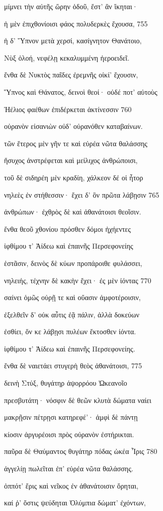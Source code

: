 μίμνει τὴν αὐτῆς ὥρην ὁδοῦ, ἔστ' ἂν ἵκηται· 

ἡ μὲν ἐπιχθονίοισι φάος πολυδερκὲς ἔχουσα, \num{755} 

ἡ δ' Ὕπνον μετὰ χερσί, κασίγνητον Θανάτοιο, 

Νὺξ ὀλοή, νεφέλῃ κεκαλυμμένη ἠεροειδεῖ.

ἔνθα δὲ Νυκτὸς παῖδες ἐρεμνῆς οἰκί' ἔχουσιν,

Ὕπνος καὶ Θάνατος, δεινοὶ θεοί· οὐδέ ποτ' αὐτοὺς 

Ἠέλιος φαέθων ἐπιδέρκεται ἀκτίνεσσιν \num{760}

οὐρανὸν εἰσανιὼν οὐδ' οὐρανόθεν καταβαίνων. 

τῶν ἕτερος μὲν γῆν τε καὶ εὐρέα νῶτα θαλάσσης 

ἥσυχος ἀνστρέφεται καὶ μείλιχος ἀνθρώποισι,

τοῦ δὲ σιδηρέη μὲν κραδίη, χάλκεον δέ οἱ ἦτορ

νηλεὲς ἐν στήθεσσιν· ἔχει δ' ὃν πρῶτα λάβῃσιν \num{765} 

ἀνθρώπων· ἐχθρὸς δὲ καὶ ἀθανάτοισι θεοῖσιν. 

ἔνθα θεοῦ χθονίου πρόσθεν δόμοι ἠχήεντες

ἰφθίμου τ' Ἀίδεω καὶ ἐπαινῆς Περσεφονείης

ἑστᾶσιν, δεινὸς δὲ κύων προπάροιθε φυλάσσει, 

νηλειής, τέχνην δὲ κακὴν ἔχει· ἐς μὲν ἰόντας \num{770} 

σαίνει ὁμῶς οὐρῇ τε καὶ οὔασιν ἀμφοτέροισιν,

ἐξελθεῖν δ' οὐκ αὖτις ἐᾷ πάλιν, ἀλλὰ δοκεύων

ἐσθίει, ὅν κε λάβῃσι πυλέων ἔκτοσθεν ἰόντα.

ἰφθίμου τ' Ἀίδεω καὶ ἐπαινῆς Περσεφονείης.

ἔνθα δὲ ναιετάει στυγερὴ θεὸς ἀθανάτοισι, \num{775}

δεινὴ Στύξ, θυγάτηρ ἀψορρόου Ὠκεανοῖο

πρεσβυτάτη· νόσφιν δὲ θεῶν κλυτὰ δώματα ναίει 

μακρῇσιν πέτρῃσι κατηρεφέ'· ἀμφὶ δὲ πάντῃ 

κίοσιν ἀργυρέοισι πρὸς οὐρανὸν ἐστήρικται.

παῦρα δὲ Θαύμαντος θυγάτηρ πόδας ὠκέα Ἶρις \num{780}

ἀγγελίῃ πωλεῖται ἐπ' εὐρέα νῶτα θαλάσσης. 

ὁππότ' ἔρις καὶ νεῖκος ἐν ἀθανάτοισιν ὄρηται, 

καί ῥ' ὅστις ψεύδηται Ὀλύμπια δώματ' ἐχόντων,

